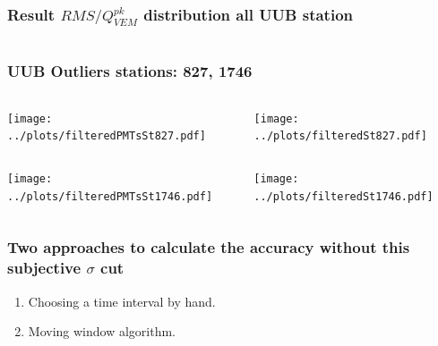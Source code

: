 \documentclass[aspectratio=169]{beamer}
\begin{document}
\begin{frame}
  \frametitle{Result $RMS/Q^{pk}_{VEM}$ distribution all UUB station}
  \vspace{0.5cm}
  \begin{columns}
    \begin{column}{.8\textwidth}
    \end{column}
  \end{columns}
\end{frame}

\begin{frame}
  \frametitle{UUB Outliers stations: 827, 1746}
  \vspace{0.5cm}
  \begin{columns}
    \begin{column}{0.5\textwidth}
      \texttt{[image: ../plots/filteredPMTsSt827.pdf]}
    \end{column}
    \begin{column}{0.5\textwidth}
      \texttt{[image: ../plots/filteredSt827.pdf]}
    \end{column}
  \end{columns}
  \begin{columns}
    \begin{column}{0.5\textwidth}
      \texttt{[image: ../plots/filteredPMTsSt1746.pdf]}
    \end{column}
    \begin{column}{0.5\textwidth}
      \texttt{[image: ../plots/filteredSt1746.pdf]}
    \end{column}
  \end{columns}
\end{frame}

\begin{frame}
  \frametitle{Two approaches to calculate the accuracy without
  this subjective $\sigma$ cut}
  \begin{enumerate}
    \item Choosing a time interval by hand.
    \item Moving window algorithm.
  \end{enumerate}
\end{frame}
\end{document}

